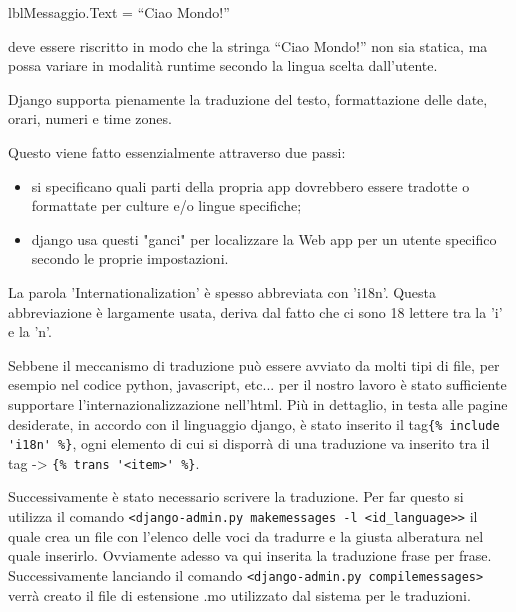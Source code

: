 lblMessaggio.Text = “Ciao Mondo!”

deve essere riscritto in modo che la stringa “Ciao Mondo!” non sia statica, ma possa variare in modalità runtime secondo la lingua scelta dall’utente.

Django supporta pienamente la traduzione del testo, formattazione delle date, orari, numeri e  time zones.

Questo viene fatto essenzialmente attraverso due passi:
\begin{itemize}
	\item si specificano quali parti della propria app dovrebbero essere tradotte o formattate per culture e/o lingue specifiche;
	\item django usa questi "ganci" per localizzare la Web app per un utente specifico secondo le proprie impostazioni.
\end{itemize}

La parola 'Internationalization' è spesso abbreviata con 'i18n'. Questa abbreviazione è largamente usata, deriva dal fatto che ci sono 18 lettere tra la 'i' e la 'n'.

Sebbene il meccanismo di traduzione può essere avviato da molti tipi di file, per esempio nel codice python, javascript, etc... per il nostro lavoro è stato sufficiente supportare l'internazionalizzazione nell'html. Più in dettaglio, in testa alle pagine desiderate, in accordo con il linguaggio django, è stato inserito  il tag\lstinline${% include 'i18n' %}$, ogni elemento di cui si disporrà di una traduzione va inserito tra il tag -> \lstinline${% trans '<item>' %}$.

Successivamente è stato necessario scrivere la traduzione. Per far questo si utilizza il comando
\lstinline$<django-admin.py makemessages -l <id_language>>$
il quale crea un file con l'elenco delle voci da tradurre e la giusta alberatura  nel quale inserirlo. Ovviamente adesso va qui inserita la traduzione frase per frase. Successivamente lanciando il comando 
\lstinline$<django-admin.py compilemessages>$
verrà creato il file di estensione .mo utilizzato dal sistema per le traduzioni.

\endinput
